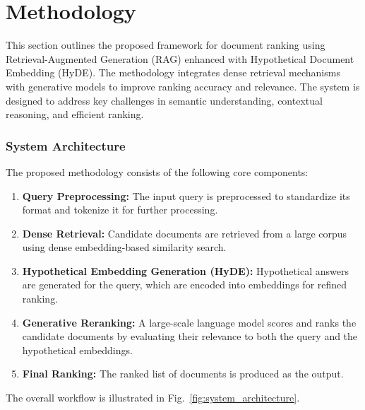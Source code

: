 \chapter{Methodology}
\label{C3} %
\clearpage

This section outlines the proposed framework for document ranking using Retrieval-Augmented Generation (RAG)\cite{rag} enhanced with Hypothetical Document Embedding (HyDE)\cite{hyde}. The methodology integrates dense retrieval mechanisms with generative models to improve ranking accuracy and relevance. The system is designed to address key challenges in semantic understanding, contextual reasoning, and efficient ranking.

\subsection{System Architecture}
The proposed methodology consists of the following core components:
\begin{enumerate}
    \item \textbf{Query Preprocessing:} The input query is preprocessed to standardize its format and tokenize it for further processing.
    \item \textbf{Dense Retrieval:} Candidate documents are retrieved from a large corpus using dense embedding-based similarity search.
    \item \textbf{Hypothetical Embedding Generation (HyDE):} Hypothetical answers are generated for the query, which are encoded into embeddings for refined ranking.
    \item \textbf{Generative Reranking:} A large-scale language model scores and ranks the candidate documents by evaluating their relevance to both the query and the hypothetical embeddings.
    \item \textbf{Final Ranking:} The ranked list of documents is produced as the output.
\end{enumerate}

The overall workflow is illustrated in Fig.~\ref{fig:system_architecture}.

